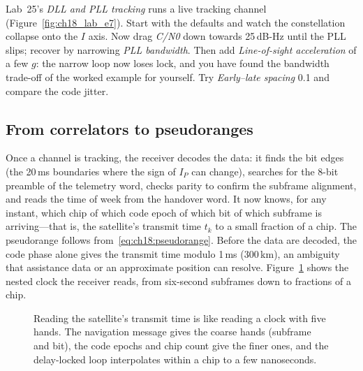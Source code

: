 \begin{tryit}
Lab~25's \emph{DLL and PLL tracking} runs a live tracking channel
(Figure~\ref{fig:ch18_lab_e7}). Start with the defaults and
watch the constellation collapse onto the $I$ axis. Now drag \emph{C/N0} down towards 25\,dB-Hz
until the PLL slips; recover by narrowing \emph{PLL bandwidth}. Then add
\emph{Line-of-sight acceleration} of a few $g$: the narrow loop now loses lock, and you have
found the bandwidth trade-off of the worked example for yourself. Try \emph{Early--late spacing}
0.1 and compare the code jitter.
\end{tryit}

\subsection{From correlators to pseudoranges}

Once a channel is tracking, the receiver decodes the data: it finds the bit edges (the
20\,ms boundaries where the sign of $I_P$ can change), searches for the 8-bit preamble of the
telemetry word, checks parity to confirm the subframe alignment, and reads the time of week
from the handover word. It now knows, for any instant, which chip of which code epoch of
which bit of which subframe is arriving---that is, the satellite's transmit time $t_k$ to a
small fraction of a chip. The pseudorange follows from~\eqref{eq:ch18:pseudorange}. Before the
data are decoded, the code phase alone gives the transmit time modulo 1\,ms (300\,km),
an ambiguity that assistance data or an approximate position can resolve.
Figure~\ref{fig:ch18_time_ladder} shows the nested clock the receiver reads, from six-second
subframes down to fractions of a chip.

\begin{figure}[htbp]\centering
{}
\caption{Reading the satellite's transmit time is like reading a clock with five hands. The
navigation message gives the coarse hands (subframe and bit), the code epochs and chip count give
the finer ones, and the delay-locked loop interpolates within a chip to a few nanoseconds.}
\label{fig:ch18_time_ladder}
\end{figure}

